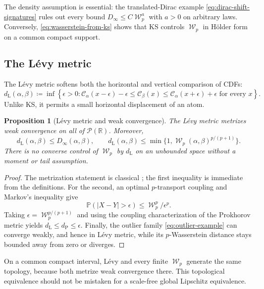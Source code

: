 \documentclass[11pt]{article}
\newtheorem{proposition}[theorem]{Proposition}
\newcommand{\RR}{\mathbb R}
\newcommand{\Pp}{\mathcal P}
\newcommand{\PP}{\mathbb P}
\newcommand{\al}{\alpha}
\newcommand{\be}{\beta}
\newcommand{\eps}{\epsilon}
\newcommand{\Cc}{\mathcal C}
\newcommand{\cumul}[1]{\Cc_{#1}}
\DeclareMathOperator{\Wass}{\mathcal W}
\newcommand{\eqdef}{\coloneqq}
\begin{document}
The density assumption is essential: the translated-Dirac example
\eqref{eq:dirac-shift-signatures} rules out every bound
$D_\infty\leq C\Wass_p^a$ with $a>0$ on arbitrary laws.  Conversely,
\eqref{eq:wasserstein-from-ks} shows that KS controls $\Wass_p$ in H\"older form
on a common compact support.

\subsection{The L\'evy metric}

The L\'evy metric softens both the horizontal and vertical comparison of
CDFs:
\begin{equation}\label{eq:levy}
 d_{\mathrm L}(\al,\be)
 \eqdef\inf\left\{\eps>0:
 \cumul{\al}(x-\eps)-\eps
 \leq \cumul{\be}(x)
 \leq \cumul{\al}(x+\eps)+\eps
 \text{ for every }x\right\}.
\end{equation}
Unlike KS, it permits a small horizontal displacement of an atom.

\begin{proposition}[L\'evy metric and weak convergence]
\label{prop:levy}
The L\'evy metric metrizes weak convergence on all of $\Pp(\RR)$.  Moreover,
\begin{equation}\label{eq:levy-comparisons}
 d_{\mathrm L}(\al,\be)\leq D_\infty(\al,\be),
 \qquad
 d_{\mathrm L}(\al,\be)
 \leq \min\{1,\Wass_p(\al,\be)^{p/(p+1)}\}.
\end{equation}
There is no converse control of $\Wass_p$ by $d_{\mathrm L}$ on an unbounded
space without a moment or tail assumption.
\end{proposition}

\begin{proof}
The metrization statement is classical \cite{Levy1925,Billingsley1999}; the
first inequality is immediate from the definitions.  For the second, an
optimal $p$-transport coupling and Markov's inequality give
\[
 \PP(|X-Y|>\eps)\leq\Wass_p^p/\eps^p.
\]
Taking $\eps=\Wass_p^{p/(p+1)}$ and using the coupling characterization of
the Prokhorov metric yields $d_{\mathrm L}\leq d_{\mathrm P}\leq\eps$.
Finally, the outlier family \eqref{eq:outlier-example} can converge weakly,
and hence in L\'evy metric, while its $p$-Wasserstein distance stays bounded
away from zero or diverges.
\end{proof}

On a common compact interval, L\'evy and every finite $\Wass_p$ generate the same
topology, because both metrize weak convergence there.  This topological
equivalence should not be mistaken for a scale-free global Lipschitz
equivalence.
\end{document}
